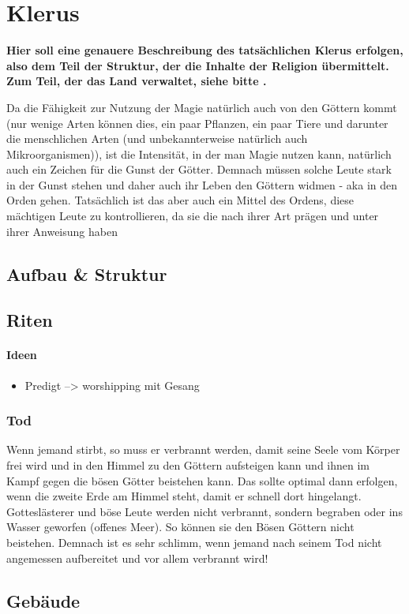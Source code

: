 \section{Klerus}
\textbf{Hier soll eine genauere Beschreibung des tatsächlichen Klerus erfolgen, also dem Teil der Struktur, der die Inhalte der Religion übermittelt. Zum Teil, der das Land verwaltet, siehe bitte .} 

Da die Fähigkeit zur Nutzung der Magie natürlich auch von den Göttern kommt (nur wenige Arten können dies, ein paar Pflanzen, ein paar Tiere und darunter die menschlichen Arten (und unbekannterweise natürlich auch Mikroorganismen)), ist die Intensität, in der man Magie nutzen kann, natürlich auch ein Zeichen für die Gunst der Götter. Demnach müssen solche Leute stark in der Gunst stehen und daher auch ihr Leben den Göttern widmen - aka in den Orden gehen. Tatsächlich ist das aber auch ein Mittel des Ordens, diese mächtigen Leute zu kontrollieren, da sie die nach ihrer Art prägen und unter ihrer Anweisung haben

\subsection{Aufbau \& Struktur}

\subsection{Riten}
\paragraph{Ideen}
\begin{itemize}
	\item Predigt --> worshipping mit Gesang
\end{itemize}

\subsubsection{Tod}
Wenn jemand stirbt, so muss er verbrannt werden, damit seine Seele vom Körper frei wird und in den Himmel zu den Göttern aufsteigen kann und ihnen im Kampf gegen die bösen Götter beistehen kann. Das sollte optimal dann erfolgen, wenn die zweite Erde am Himmel steht, damit er schnell dort hingelangt. 
Gotteslästerer und böse Leute werden nicht verbrannt, sondern begraben oder ins Wasser geworfen (offenes Meer). So können sie den Bösen Göttern nicht beistehen.
Demnach ist es sehr schlimm, wenn jemand nach seinem Tod nicht angemessen aufbereitet und vor allem verbrannt wird!

\subsection{Gebäude}
